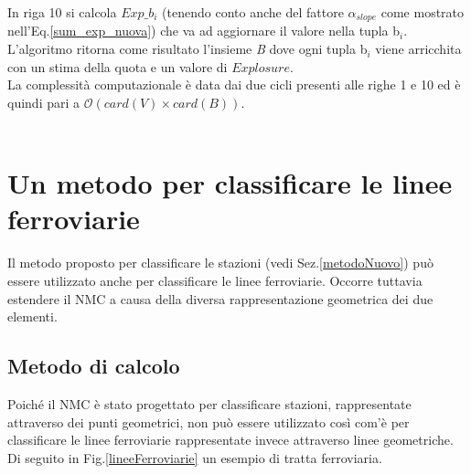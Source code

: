 In riga 10 si calcola $Exp\_b_i$ (tenendo conto anche del fattore $\alpha_{slope}$ come mostrato nell'Eq.\ref{sum_exp_nuova}) che va ad aggiornare il valore nella tupla b$_i$.\\
L'algoritmo ritorna come risultato l'insieme \textit{B} dove ogni tupla b$_i$ viene arricchita con un stima della quota e un valore di $Explosure$. 
\mbox{}\\
La complessità computazionale è data dai due cicli presenti alle righe 1 e 10 ed è quindi pari a $\mathcal{O}(card(\textit{V}) \times card(\textit{B}))$. \\
\mbox{}\\





\section{Un metodo per classificare le linee ferroviarie}
Il metodo proposto per classificare le stazioni (vedi Sez.\ref{metodoNuovo}) può essere utilizzato anche per classificare le linee ferroviarie. Occorre tuttavia estendere il NMC a causa della diversa rappresentazione geometrica dei due elementi.


\subsection{Metodo di calcolo}
Poiché il NMC è stato progettato per classificare stazioni,  rappresentate attraverso dei punti geometrici, non può essere utilizzato così com'è per classificare le linee ferroviarie rappresentate invece attraverso linee geometriche. Di seguito in Fig.\ref{lineeFerroviarie} un esempio di tratta ferroviaria.

